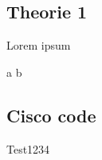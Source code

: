 \documentclass{htlstpif_protokoll}
\begin{document}
  \htlstpiftitlepage

  \tableofcontents

  \begin{theorie}
    \section{Theorie 1}

    Lorem ipsum

    a \arrow b


  \end{theorie}

  \begin{praxis}
    \section{Cisco code}

    \begin{code}
Test1234
    \end{code}
  \end{praxis}

\end{document}
